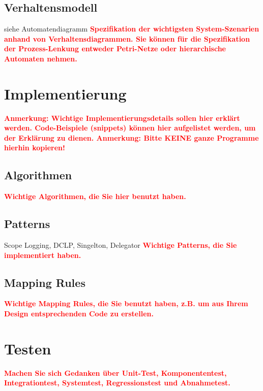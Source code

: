 \documentclass[oneside,a4paper,titlepage]{scrartcl} %
\begin{document}
\subsection{Verhaltensmodell}
siehe Automatendiagramm \newline
\textcolor{red}{\textbf{Spezifikation der wichtigsten System-Szenarien anhand von Verhaltensdiagrammen.
Sie können für die Spezifikation der Prozess-Lenkung entweder Petri-Netze oder hierarchische Automaten nehmen.}}

\newpage

\section{Implementierung}
\textcolor{red}{\textbf{Anmerkung: Wichtige Implementierungsdetails sollen hier erklärt werden.
Code-Beispiele (snippets) können hier aufgelistet werden, um der Erklärung zu dienen.
Anmerkung: Bitte KEINE ganze Programme hierhin kopieren!}}

\subsection{Algorithmen}
\textcolor{red}{\textbf{Wichtige Algorithmen, die Sie hier benutzt haben.}}

\subsection{Patterns}
Scope Logging, DCLP, Singelton, Delegator \newline
\textcolor{red}{\textbf{Wichtige Patterns, die Sie implementiert haben.}}

\subsection{Mapping Rules}
\textcolor{red}{\textbf{Wichtige Mapping Rules, die Sie benutzt haben, z.B.
um aus Ihrem Design entsprechenden Code zu erstellen.}}

\newpage

\section{Testen}
\textcolor{red}{\textbf{Machen Sie sich Gedanken über Unit-Test, Komponententest,
Integrationtest, Systemtest, Regressionstest und Abnahmetest.}}
\end{document}

